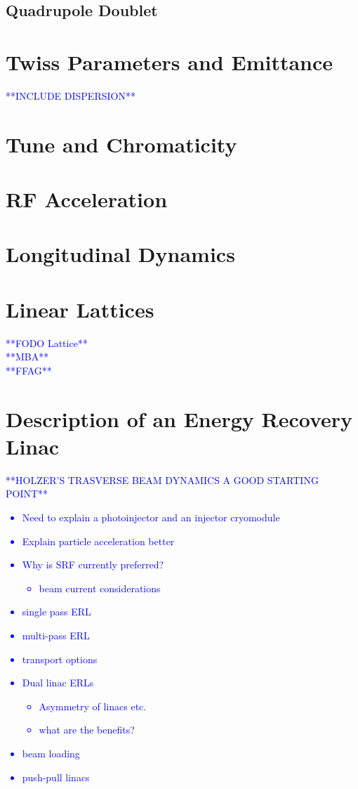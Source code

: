 \documentclass[../main.tex]{subfiles}
\begin{document}
\subsection{Quadrupole Doublet}

\section{Twiss Parameters and Emittance}
\textcolor{blue}{**INCLUDE DISPERSION**}

\section{Tune and Chromaticity}

\section{RF Acceleration}

\section{Longitudinal Dynamics}

\section{Linear Lattices}
\textcolor{blue}{**FODO Lattice** \\ **MBA** \\ **FFAG**}

\section{Description of an Energy Recovery Linac}

\textcolor{blue}{**HOLZER'S TRASVERSE BEAM DYNAMICS A GOOD STARTING POINT**}

\textcolor{blue}{\begin{itemize}
    \item{Need to explain a photoinjector and an injector cryomodule}
    \item{Explain particle acceleration better}
    \item{Why is SRF currently preferred?
        \begin{itemize}
            \item{beam current considerations} 
        \end{itemize}}
    \item{single pass ERL}
    \item{multi-pass ERL}
    \item{transport options}
    \item{Dual linac ERLs
        \begin{itemize}
            \item{Asymmetry of linacs etc.}
            \item{what are the benefits?}
        \end{itemize}}
    \item{beam loading}
    \item{push-pull linacs}
\end{itemize}}
\end{document}
